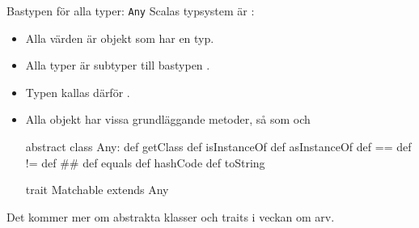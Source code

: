 


\begin{Slide}{Bastypen för alla typer: \texttt{Any}}
\SlideFontSmall
Scalas typsystem är :
\begin{itemize}\SlideFontSmall
  \item Alla värden är objekt som har en typ.
  \item Alla typer är subtyper till bastypen .
  \item Typen  kallas därför .
  \item Alla objekt har vissa grundläggande metoder, så som  och \code{==}
\begin{Code}
abstract class Any:
  def getClass
  def isInstanceOf
  def asInstanceOf
  def ==
  def !=
  def ##
  def equals
  def hashCode
  def toString

trait Matchable extends Any
\end{Code}
\end{itemize}

Det kommer mer om abstrakta klasser och traits i veckan om arv.
\end{Slide}

